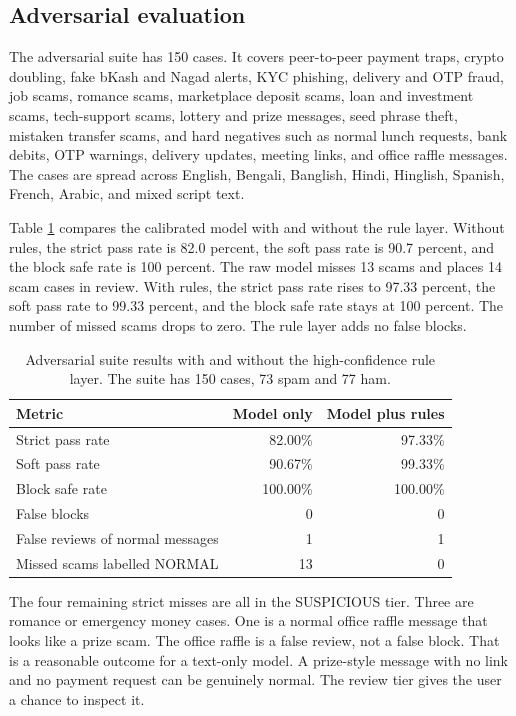 \documentclass[11pt]{article}
\begin{document}
\subsection{Adversarial evaluation}

The adversarial suite has 150 cases. It covers peer-to-peer payment traps, crypto doubling, fake bKash and Nagad alerts, KYC phishing, delivery and OTP fraud, job scams, romance scams, marketplace deposit scams, loan and investment scams, tech-support scams, lottery and prize messages, seed phrase theft, mistaken transfer scams, and hard negatives such as normal lunch requests, bank debits, OTP warnings, delivery updates, meeting links, and office raffle messages. The cases are spread across English, Bengali, Banglish, Hindi, Hinglish, Spanish, French, Arabic, and mixed script text.

Table \ref{tab:adversarial} compares the calibrated model with and without the rule layer. Without rules, the strict pass rate is 82.0 percent, the soft pass rate is 90.7 percent, and the block safe rate is 100 percent. The raw model misses 13 scams and places 14 scam cases in review. With rules, the strict pass rate rises to 97.33 percent, the soft pass rate to 99.33 percent, and the block safe rate stays at 100 percent. The number of missed scams drops to zero. The rule layer adds no false blocks.

\begin{table}[htbp]
\centering
\small
\caption{Adversarial suite results with and without the high-confidence rule layer. The suite has 150 cases, 73 spam and 77 ham.}
\label{tab:adversarial}
\begin{tabular}{lrr}
\toprule
Metric & Model only & Model plus rules \\
\midrule
Strict pass rate & 82.00\% & 97.33\% \\
Soft pass rate & 90.67\% & 99.33\% \\
Block safe rate & 100.00\% & 100.00\% \\
False blocks & 0 & 0 \\
False reviews of normal messages & 1 & 1 \\
Missed scams labelled NORMAL & 13 & 0 \\
\bottomrule
\end{tabular}
\end{table}

The four remaining strict misses are all in the SUSPICIOUS tier. Three are romance or emergency money cases. One is a normal office raffle message that looks like a prize scam. The office raffle is a false review, not a false block. That is a reasonable outcome for a text-only model. A prize-style message with no link and no payment request can be genuinely normal. The review tier gives the user a chance to inspect it.
\end{document}
